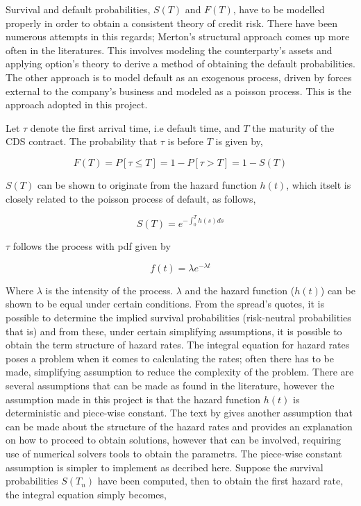 \documentclass[a4paper,12pt]{article}
\begin{document}
Survival and default probabilities, $S(T)$ and $F(T)$, have to be modelled properly in order to obtain a consistent theory of credit risk. There have been numerous attempts in this regards; Merton's structural approach comes up more often in the literatures. This involves modeling the counterparty's assets and applying option's theory to derive a method of obtaining the default probabilities. The other approach is to model default as an exogenous process, driven by forces external to the company's business and modeled as a poisson process. This is the approach adopted in this project. 

Let $\tau$ denote the first arrival time, i.e default time, and $T$ the maturity of the CDS contract. The probability that $\tau$ is before $T$ is given by, 

\begin{equation}
F(T) = P[\tau \leq T] = 1 - P[\tau > T] = 1 - S(T)
\end{equation}

$S(T)$ can be shown to originate from the hazard function $h(t)$, which itselt is closely related to the poisson process of default, as follows, 

 \begin{equation}
S(T) = e^{-\int_0^Th(s)ds}
\end{equation}

$\tau$ follows the process with pdf given by 

$$f(t) = \lambda e^{-\lambda t}$$ 

Where $\lambda$ is the intensity of the process. $\lambda$ and the hazard function ($h(t)$) can be shown to be equal under certain conditions. From the spread's quotes, it is possible to determine the implied survival probabilities (risk-neutral probabilities that is) and from these, under certain simplifying assumptions, it is possible to obtain the term structure of hazard rates. The integral equation for hazard rates poses a problem when it comes to calculating the rates; often there has to be made, simplifying assumption to reduce the complexity of the problem. There are several assumptions that can be made as found in the literature, however the assumption made in this project is that the hazard function $h(t)$ is deterministic and piece-wise constant. The text by \cite{credit} gives another assumption that can be made about the structure of the hazard rates and provides an explanation on how to proceed to obtain solutions, however that can be involved, requiring use of numerical solvers tools to obtain the parametrs. The piece-wise constant assumption is simpler to implement as decribed here. 
Suppose the survival probabilities $S(T_n)$ have been computed, then to obtain the first hazard rate, the integral equation simply becomes, 
\end{document}
